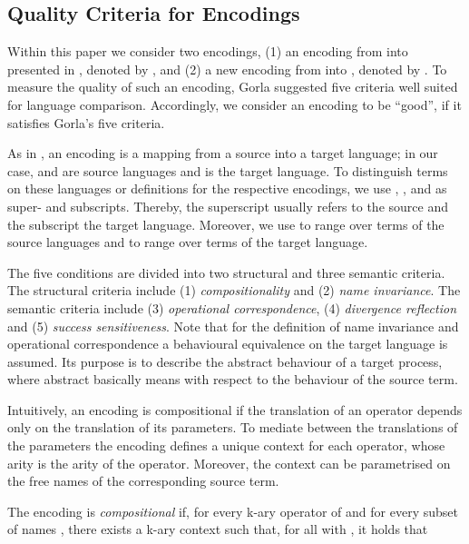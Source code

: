 \documentclass[]{llncs}
\begin{document}
\subsection{Quality Criteria for Encodings}
\label{sec:qualityCriteria}

Within this paper we consider two encodings, (1) an encoding from \piSep into \piAsyn presented in \cite{nestmann00}, denoted by , and (2) a new encoding from \piMix into \piAsyn, denoted by . To measure the quality of such an encoding, Gorla \cite{gorla10} suggested five criteria well suited for language comparison. Accordingly, we consider an encoding to be ``good'', if it satisfies Gorla's five criteria.

As in \cite{gorla10}, an encoding is a mapping from a source into a target language; in our case, \piMix and \piSep are source languages and \piAsyn is the target language. To distinguish terms on these languages or definitions for the respective encodings, we use , , and  as super- and subscripts. Thereby, the superscript usually refers to the source and the subscript the target language. Moreover, we use  to range over terms of the source languages and  to range over terms of the target language.

The five conditions are divided into two structural and three semantic criteria. The structural criteria include (1) \emph{compositionality} and (2) \emph{name invariance}. The semantic criteria include (3) \emph{operational correspondence}, (4) \emph{divergence reflection} and (5) \emph{success sensitiveness}. Note that for the definition of name invariance and operational correspondence a behavioural equivalence  on the target language is assumed. Its purpose is to describe the abstract behaviour of a target process, where abstract basically means with respect to the behaviour of the source term.

Intuitively, an encoding is compositional if the translation of an operator depends only on the translation of its parameters. To mediate between the translations of the parameters the encoding defines a unique context for each operator, whose arity is the arity of the operator. Moreover, the context can be parametrised on the free names of the corresponding source term.

\begin{definition}
\label{def:compositionality}
	The encoding  is \emph{compositional} if, for every k-ary operator  of  and for every subset of names , there exists a k-ary context  such that, for all  with , it holds that
	
\end{definition}
\end{document}
